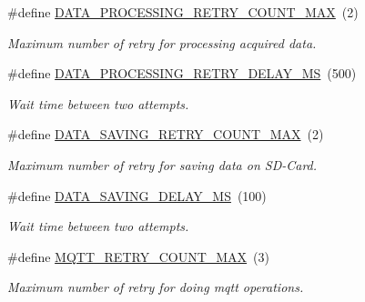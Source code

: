 \begin{DoxyCompactItemize}
\mbox{\label{rmap-config_8h_a7e36149c4e27cedef72823f8212b4fea}} 
\#define \hyperlink{rmap-config_8h_a7e36149c4e27cedef72823f8212b4fea}{D\+A\+T\+A\+\_\+\+P\+R\+O\+C\+E\+S\+S\+I\+N\+G\+\_\+\+R\+E\+T\+R\+Y\+\_\+\+C\+O\+U\+N\+T\+\_\+\+M\+AX}~(2)
\begin{DoxyCompactList}\small\item\em Maximum number of retry for processing acquired data. \end{DoxyCompactList}\item 
\mbox{\label{rmap-config_8h_a2933698b1b2aa94bf5755a89efbd05f7}} 
\#define \hyperlink{rmap-config_8h_a2933698b1b2aa94bf5755a89efbd05f7}{D\+A\+T\+A\+\_\+\+P\+R\+O\+C\+E\+S\+S\+I\+N\+G\+\_\+\+R\+E\+T\+R\+Y\+\_\+\+D\+E\+L\+A\+Y\+\_\+\+MS}~(500)
\begin{DoxyCompactList}\small\item\em Wait time between two attempts. \end{DoxyCompactList}\item 
\mbox{\label{rmap-config_8h_a81ed8eac7c6867ba31602628402f97c1}} 
\#define \hyperlink{rmap-config_8h_a81ed8eac7c6867ba31602628402f97c1}{D\+A\+T\+A\+\_\+\+S\+A\+V\+I\+N\+G\+\_\+\+R\+E\+T\+R\+Y\+\_\+\+C\+O\+U\+N\+T\+\_\+\+M\+AX}~(2)
\begin{DoxyCompactList}\small\item\em Maximum number of retry for saving data on S\+D-\/\+Card. \end{DoxyCompactList}\item 
\mbox{\label{rmap-config_8h_a511bba65f6e387335efa4c2ca6a9d948}} 
\#define \hyperlink{rmap-config_8h_a511bba65f6e387335efa4c2ca6a9d948}{D\+A\+T\+A\+\_\+\+S\+A\+V\+I\+N\+G\+\_\+\+D\+E\+L\+A\+Y\+\_\+\+MS}~(100)
\begin{DoxyCompactList}\small\item\em Wait time between two attempts. \end{DoxyCompactList}\item 
\mbox{\label{rmap-config_8h_a823e4d8bca9ba0990f5c085dc997fafb}} 
\#define \hyperlink{rmap-config_8h_a823e4d8bca9ba0990f5c085dc997fafb}{M\+Q\+T\+T\+\_\+\+R\+E\+T\+R\+Y\+\_\+\+C\+O\+U\+N\+T\+\_\+\+M\+AX}~(3)
\begin{DoxyCompactList}\small\item\em Maximum number of retry for doing mqtt operations. \end{DoxyCompactList}\item 

\end{DoxyCompactItemize}
